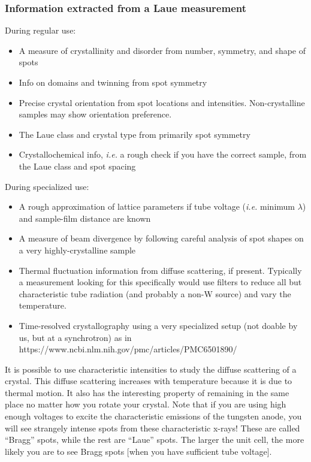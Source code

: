 \subsubsection{Information extracted from a Laue measurement}
\begin{singlespace}
During regular use:
\begin{itemize}
    \item A measure of crystallinity and disorder from number, symmetry, and shape of spots
    \item Info on domains and twinning from spot symmetry
    \item Precise crystal orientation from spot locations and intensities. Non-crystalline samples may show orientation preference.
    \item The Laue class and crystal type from primarily spot symmetry 
    \item Crystallochemical info, \textit{i.e.} a rough check if you have the correct sample, from the Laue class and spot spacing
\end{itemize}
\end{singlespace}
During specialized use:
\begin{itemize}
    \item A rough approximation of lattice parameters if tube voltage (\textit{i.e.} minimum $\lambda$) and sample-film distance are known
    \item A measure of beam divergence by following careful analysis of spot shapes on a very highly-crystalline sample 
    \item Thermal fluctuation information from diffuse scattering, if present. Typically a measurement looking for this specifically would use filters to reduce all but characteristic tube radiation (and probably a non-W source) and vary the temperature.
    \item Time-resolved crystallography using a very specialized setup (not doable by us, but at a synchrotron) as in https://www.ncbi.nlm.nih.gov/pmc/articles/PMC6501890/ 
\end{itemize}
It is possible to use characteristic intensities to study the diffuse scattering of a crystal. This diffuse scattering increases with temperature because it is due to thermal motion. It also has the interesting property of remaining in the same place no matter how you rotate your crystal.
Note that if you are using high enough voltages to excite the characteristic emissions of the tungsten anode, you will see strangely intense spots from these characteristic x-rays! These are called “Bragg” spots, while the rest are “Laue” spots. The larger the unit cell, the more likely you are to see Bragg spots [when you have sufficient tube voltage].
